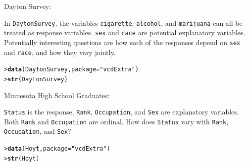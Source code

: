 \documentclass[10pt]{report}\usepackage[]{graphicx}\usepackage[]{color}
\makeatletter
\newcommand{\hlstr}[1]{\textcolor[rgb]{0.192,0.494,0.8}{#1}}%
\newcommand{\hlstd}[1]{\textcolor[rgb]{0.345,0.345,0.345}{#1}}%
\newcommand{\hlkwc}[1]{\textcolor[rgb]{0.333,0.667,0.333}{#1}}%
\newcommand{\hlkwd}[1]{\textcolor[rgb]{0.737,0.353,0.396}{\textbf{#1}}}%
\newenvironment{kframe}{%
 \def\at@end@of@kframe{}%
 \ifinner\ifhmode%
  \def\at@end@of@kframe{\end{minipage}}%
  \begin{minipage}{\columnwidth}%
 \fi\fi%
 \def\FrameCommand##1{\hskip\@totalleftmargin \hskip-\fboxsep
 \colorbox{shadecolor}{##1}\hskip-\fboxsep
     \hskip-\linewidth \hskip-\@totalleftmargin \hskip\columnwidth}%
 \MakeFramed {\advance\hsize-\width
   \@totalleftmargin\z@ \linewidth\hsize
   \@setminipage}}%
 {\par\unskip\endMakeFramed%
 \at@end@of@kframe}
\newenvironment{knitrout}{}{} %
\renewenvironment{knitrout}{\small\renewcommand{\baselinestretch}{.85}}{} %
\makeatother
\begin{document}
\begin{Exercises}
\begin{enumerate*}
    \item Dayton Survey: 
    \begin{ans}
      In \texttt{DaytonSurvey}, the variables \texttt{cigarette}, \texttt{alcohol}, and \texttt{marijuana} can all be treated as
      response variables.
      \texttt{sex} and \texttt{race} are potential explanatory variables. Potentially interesting questions are how
      each of the responses depend on \texttt{sex} and \texttt{race}, and how they vary jointly.
\begin{knitrout}\footnotesize
{}\color{fgcolor}\begin{kframe}
\begin{alltt}
\hlstd{> }\hlkwd{data}\hlstd{(DaytonSurvey,} \hlkwc{package}\hlstd{=}\hlstr{"vcdExtra"}\hlstd{)}
\hlstd{> }\hlkwd{str}\hlstd{(DaytonSurvey)}
\end{alltt}
\end{kframe}
\end{knitrout}
    \end{ans}
        
    \item Minnesota High School Graduates: 
    \begin{ans}
      \texttt{Status} is the response, \texttt{Rank}, \texttt{Occupation}, and \texttt{Sex} are explanatory variables. 
      Both \texttt{Rank} and \texttt{Occupation} are ordinal. How does \texttt{Status} vary with \texttt{Rank}, \texttt{Occupation}, and \texttt{Sex}?
\begin{knitrout}\footnotesize
{}\color{fgcolor}\begin{kframe}
\begin{alltt}
\hlstd{> }\hlkwd{data}\hlstd{(Hoyt,} \hlkwc{package}\hlstd{=}\hlstr{"vcdExtra"}\hlstd{)}
\hlstd{> }\hlkwd{str}\hlstd{(Hoyt)}
\end{alltt}
\end{kframe}
\end{knitrout}
    \end{ans}    
    
  \end{enumerate*}


\end{Exercises}
\end{document}
